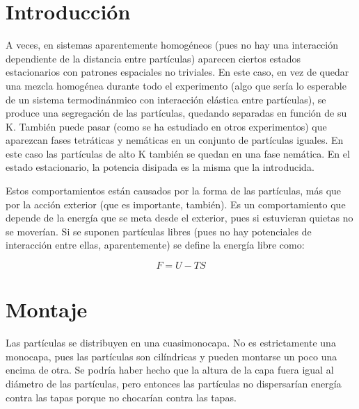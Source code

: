\documentclass[twoside]{article}
\begin{document}
\begin{multicols}{2} %

\section*{Introducci\'on}

A veces, en sistemas aparentemente homog\'eneos (pues no hay una interacci\'on dependiente de la distancia entre part\'iculas) aparecen ciertos estados estacionarios con patrones espaciales no triviales. En este caso, en vez de quedar una mezcla homog\'enea durante todo el experimento (algo que ser\'ia lo esperable de un sistema termodin\'anmico con interacci\'on el\'astica entre part\'iculas), se produce una segregaci\'on de las part\'iculas, quedando separadas en funci\'on de su K. Tambi\'en puede pasar (como se ha estudiado en otros experimentos) que aparezcan fases tetr\'aticas y nem\'aticas en un conjunto de part\'iculas iguales. En este caso las part\'iculas de alto K tambi\'en se quedan en una fase nem\'atica. En el estado estacionario, la potencia disipada es la misma que la introducida. 

Estos comportamientos est\'an causados por la forma de las part\'iculas, m\'as que por la acci\'on exterior (que es importante, tambi\'en). Es un comportamiento que depende de la energ\'ia que se meta desde el exterior, pues si estuvieran quietas no se mover\'ian. Si se suponen part\'iculas libres (pues no hay potenciales de interacci\'on entre ellas, aparentemente) se  define la energ\'ia libre como:

\begin{equation}
F = U - TS
\end{equation}




\section*{Montaje}

Las part\'iculas se distribuyen en una cuasimonocapa. No es estrictamente una monocapa, pues las part\'iculas son cil\'indricas y pueden montarse un poco una encima de otra. Se podr\'ia haber hecho que la altura de la capa fuera igual al di\'ametro de las part\'iculas, pero entonces las part\'iculas no dispersar\'ian energ\'ia contra las tapas porque no chocar\'ian contra las tapas.


\end{multicols}
\end{document}
